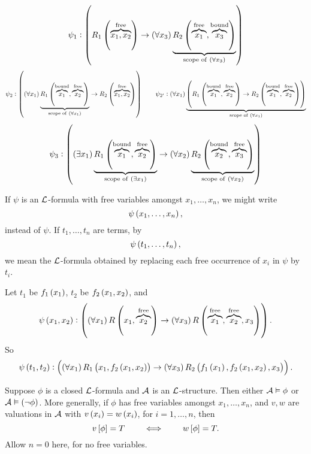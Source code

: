 \begin{example*}
$$ \psi_1 : \impb{R_1\br{\overbrace{x_1, x_2}^{\text{free}}}}{\fab{x_3}\underbrace{R_2\br{\overbrace{x_1}^{\text{free}}, \overbrace{x_3}^{\text{bound}}}}_{\text{scope of} \ \fab{x_3}}} $$
$$ \psi_2 : \impb{\fab{x_1}\underbrace{R_1\br{\overbrace{x_1}^{\text{bound}}, \overbrace{x_2}^{\text{free}}}}_{\text{scope of} \ \fab{x_1}}}{R_2\br{\overbrace{x_1, x_2}^{\text{free}}}} \qquad \psi_{2'} : \fab{x_1}\underbrace{\impb{R_1\br{\overbrace{x_1}^{\text{bound}}, \overbrace{x_2}^{\text{free}}}}{R_2\br{\overbrace{x_1}^{\text{bound}}, \overbrace{x_2}^{\text{free}}}}}_{\text{scope of} \ \fab{x_1}} $$
$$ \psi_3 : \impb{\teb{x_1}\underbrace{R_1\br{\overbrace{x_1}^{\text{bound}}, \overbrace{x_2}^{\text{free}}}}_{\text{scope of} \ \teb{x_1}}}{\fab{x_2}\underbrace{R_2\br{\overbrace{x_2}^{\text{bound}}, \overbrace{x_3}^{\text{free}}}}_{\text{scope of} \ \fab{x_2}}} $$
\end{example*}

\begin{definition}
If $ \psi $ is an $ \LL $-formula with free variables amongst $ x_1, \dots, x_n $, we might write
$$ \psi\br{x_1, \dots, x_n}, $$
instead of $ \psi $. If $ t_1, \dots, t_n $ are terms, by
$$ \psi\br{t_1, \dots, t_n}, $$
we mean the $ \LL $-formula obtained by replacing each free occurrence of $ x_i $ in $ \psi $ by $ t_i $.
\end{definition}

\begin{example*}
Let $ t_1 $ be $ f_1\br{x_1} $, $ t_2 $ be $ f_2\br{x_1, x_2} $, and
$$ \psi\br{x_1, x_2} : \impb{\fab{x_1}R\br{x_1, \overbrace{x_2}^{\text{free}}}}{\fab{x_3}R\br{\overbrace{x_1}^{\text{free}}, \overbrace{x_2}^{\text{free}}, x_3}}. $$
So
$$ \psi\br{t_1, t_2} : \impb{\fab{x_1}R_1\br{x_1, f_2\br{x_1, x_2}}}{\fab{x_3}R_2\br{f_1\br{x_1}, f_2\br{x_1, x_2}, x_3}}. $$
\end{example*}

\pagebreak

\begin{theorem}
\label{thm:2.3.3}
Suppose $ \phi $ is a closed $ \LL $-formula and $ \AA $ is an $ \LL $-structure. Then either $ \AA \vDash \phi $ or $ \AA \vDash \notb{\phi} $. More generally, if $ \phi $ has free variables amongst $ x_1, \dots, x_n $, and $ v, w $ are valuations in $ \AA $ with $ v\br{x_i} = w\br{x_i} $, for $ i = 1, \dots, n $, then
$$ v\sbr{\phi} = T \qquad \iff \qquad w\sbr{\phi} = T. $$
Allow $ n = 0 $ here, for no free variables.
\end{theorem}

